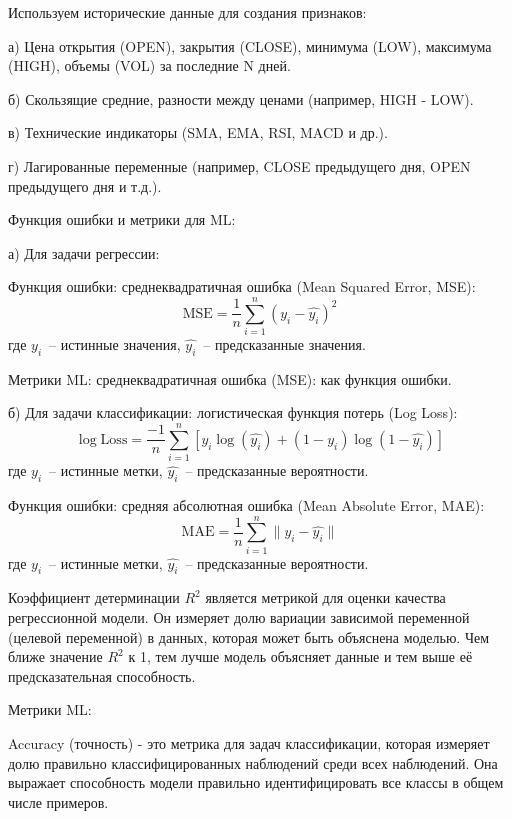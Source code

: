 Используем исторические данные для создания признаков:

а) Цена открытия (OPEN), закрытия (CLOSE), минимума (LOW), максимума (HIGH), объемы (VOL) за последние N дней.

б) Скользящие средние, разности между ценами (например, HIGH - LOW).

в) Технические индикаторы (SMA, EMA, RSI, MACD и др.).

г) Лагированные переменные (например, CLOSE предыдущего дня, OPEN предыдущего дня и т.д.).

Функция ошибки и метрики для ML:

а) Для задачи регрессии:

Функция ошибки: среднеквадратичная ошибка (\foreignlanguage{english}{Mean} \foreignlanguage{english}{Squared}
\foreignlanguage{english}{Error}, \foreignlanguage{english}{MSE}):
\[
\mathrm{MSE}=\frac 1 n\sum _{i=1}^n(y_i-\widehat
{y_i})^2
\]
где  $y_i$\ – истинные значения,  $\widehat {y_i}$\ – предсказанные значения.

Метрики \foreignlanguage{english}{ML}: среднеквадратичная ошибка (\foreignlanguage{english}{MSE}): как функция ошибки.

б) Для задачи классификации: логистическая функция потерь (\foreignlanguage{english}{Log} \foreignlanguage{english}{Loss}):
\[
 \log \mathrm{Loss}=\frac{-1} n\sum _{i=1}^n[y_i\log \left(\widehat {y_i}\right)+\left(1-y_i\right)\log(1-\widehat {y_i})]
 \]
 где  $y_i$\ – истинные метки,  $\widehat {y_i}$\ – предсказанные вероятности.

Функция ошибки: средняя абсолютная ошибка (\foreignlanguage{english}{Mean} \foreignlanguage{english}{Absolute}
\foreignlanguage{english}{Error}, \foreignlanguage{english}{MAE}):
\[
\mathrm{MAE}=\frac 1 n\sum _{i=1}^n\|
y_i-\widehat {y_i}\| 
\]
 где  $y_i$\ – истинные метки,  $\widehat {y_i}$\ – предсказанные вероятности.
 
Коэффициент детерминации $R^2$ является метрикой для оценки качества регрессионной модели. Он измеряет долю вариации зависимой переменной (целевой переменной) в данных, которая может быть объяснена моделью. Чем ближе значение $R^2$ к 1, тем лучше модель объясняет данные и тем выше её предсказательная способность.

Метрики ML:

Accuracy (точность) - это метрика для задач классификации, которая измеряет долю правильно классифицированных наблюдений среди всех наблюдений. Она выражает способность модели правильно идентифицировать все классы в общем числе примеров.

